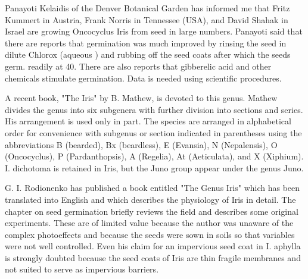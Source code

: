 \begin{description}
Panayoti Kelaidis of the Denver Botanical Garden has informed me that Fritz Kummert
in Austria, Frank Norris in Tennessee (USA), and David Shahak in Israel are growing
Oncocyclus Iris from seed in large numbers. Panayoti said that there are reports that
germination was much improved by rinsing the seed in dilute Chlorox (aqueous
) and rubbing off the seed coats after which the seeds germ. readily at 40.
There are also reports that gibberelic acid and other chemicals stimulate germination.
Data is needed using scientific procedures.

A recent book, "The Iris" by B. Mathew, is devoted to this genus. Mathew
divides the genus into six subgenera with further division into sections and series. His
arrangement is used only in part. The species are arranged in alphabetical order for
convenience with subgenus or section indicated in parentheses using the
abbreviations B (bearded), Bx (beardless), E (Evansia), N (Nepalensis), O
(Oncocyclus), P (Pardanthopsis), A (Regelia), At (Aeticulata), and X (Xiphium). I.
dichotoma is retained in Iris, but the Juno group appear under the genus Juno.

G. I. Rodionenko has published a book entitled "The Genus Iris" which has been
translated into English and which describes the physiology of Iris in detail. The
chapter on seed germination briefly reviews the field and describes some original
experiments. These are of limited value because the author was unaware of the
complex photoeffects and because the seeds were sown in soils so that variables
were not well controlled. Even his claim for an impervious seed coat in I. aphylla is
strongly doubted because the seed coats of Iris are thin fragile membranes and not
suited to serve as impervious barriers.


\end{description}
